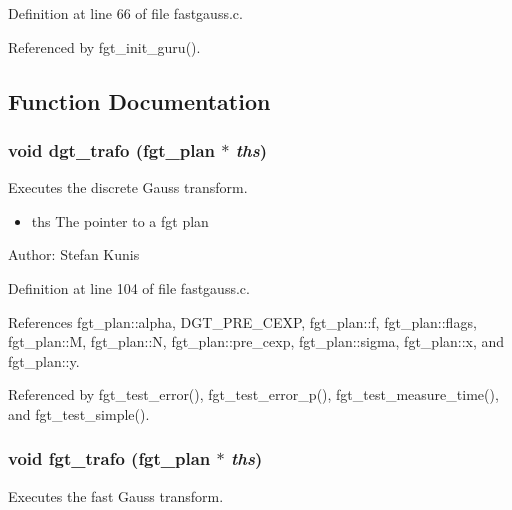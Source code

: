 Definition at line 66 of file fastgauss.c.

Referenced by fgt\_\-init\_\-guru().

\subsection{Function Documentation}
\hypertarget{group__applications__fastgauss_g42f141fc768ced46eb2dac284b063b80}{
\subsubsection{\setlength{\rightskip}{0pt plus 5cm}void dgt\_\-trafo ({\bf fgt\_\-plan} $\ast$ {\em ths})}}
\label{group__applications__fastgauss_g42f141fc768ced46eb2dac284b063b80}


Executes the discrete Gauss transform. 

\begin{itemize}
\item ths The pointer to a fgt plan\end{itemize}
\begin{Desc}
\item[Author:]Stefan Kunis \end{Desc}


Definition at line 104 of file fastgauss.c.

References fgt\_\-plan::alpha, DGT\_\-PRE\_\-CEXP, fgt\_\-plan::f, fgt\_\-plan::flags, fgt\_\-plan::M, fgt\_\-plan::N, fgt\_\-plan::pre\_\-cexp, fgt\_\-plan::sigma, fgt\_\-plan::x, and fgt\_\-plan::y.

Referenced by fgt\_\-test\_\-error(), fgt\_\-test\_\-error\_\-p(), fgt\_\-test\_\-measure\_\-time(), and fgt\_\-test\_\-simple().\hypertarget{group__applications__fastgauss_gb12b6f7c36927db24d8555484dcdfde0}{
\subsubsection{\setlength{\rightskip}{0pt plus 5cm}void fgt\_\-trafo ({\bf fgt\_\-plan} $\ast$ {\em ths})}}
\label{group__applications__fastgauss_gb12b6f7c36927db24d8555484dcdfde0}


Executes the fast Gauss transform. 

